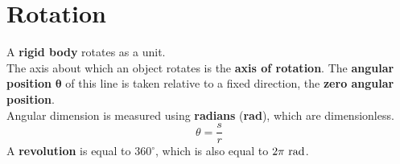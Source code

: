 \documentclass[../AP_Physics_C.tex]{subfiles}
\begin{document}
	\section{Rotation}
		A \textbf{rigid body} rotates as a unit. \\
		The axis about which an object rotates is the \textbf{axis of rotation}. The \textbf{angular position} $\pmb{\theta}$ of this line is taken relative to a fixed direction, the \textbf{zero angular position}. \\
		Angular dimension is measured using \textbf{radians} (\textbf{rad}), which are dimensionless.
		\[\theta = \frac{s}{r}\]
		A \textbf{revolution} is equal to $360^\circ$, which is also equal to $2\pi\,\operatorname{rad}$.
\end{document}
